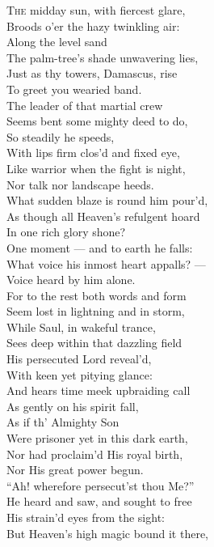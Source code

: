 \textsc{The} midday sun, with fiercest glare, \\
 Broods o’er the hazy twinkling air: \\
 Along the level sand \\
 The palm-tree’s shade unwavering lies, \\
 Just as thy towers, Damascus, rise \\
 To greet you wearied band. \\
  The leader of that martial crew \\
 Seems bent some mighty deed to do, \\
 So steadily he speeds, \\
 With lips firm clos’d and fixed eye, \\
 Like warrior when the fight is night, \\
 Nor talk nor landscape heeds. \\
  What sudden blaze is round him pour’d, \\
 As though all Heaven’s refulgent hoard \\
 In one rich glory shone? \\
 One moment — and to earth he falls: \\
 What voice his inmost heart appalls? — \\
 Voice heard by him alone. \\
  For to the rest both words and form \\
 Seem lost in lightning and in storm, \\
 While Saul, in wakeful trance, \\
 Sees deep within that dazzling field \\
 His persecuted Lord reveal’d, \\
 With keen yet pitying glance: \\
  And hears time meek upbraiding call \\
 As gently on his spirit fall, \\
 As if th’ Almighty Son \\
 Were prisoner yet in this dark earth, \\
 Nor had proclaim’d His royal birth, \\
 Nor His great power begun. \\
  “Ah! wherefore persecut’st thou Me?” \\
 He heard and saw, and sought to free \\
 His strain’d eyes from the sight: \\
 But Heaven’s high magic bound it there, \\
